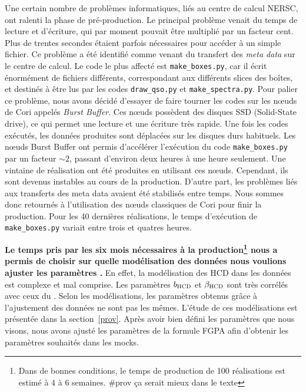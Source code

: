 \documentclass[11pt, twoside, a4paper, openright]{report}
\begin{document}
Une certain nombre de problèmes informatiques, liés au centre de calcul NERSC, ont ralenti la phase de pré-production. Le principal problème venait du temps de lecture et d'écriture, qui par moment pouvait être multiplié par un facteur cent. Plus de trentes secondes étaient parfois nécessaires pour accéder à un simple fichier. Ce problème a été identifié comme venant du transfert des \emph{meta data} sur le centre de calcul. Le code le plus affecté est \texttt{make\_boxes.py}, car il écrit énormément de fichiers différents, correspondant aux différents slices des boîtes, et destinés à être lus par les codes \texttt{draw\_qso.py} et \texttt{make\_spectra.py}. Pour palier ce problème, nous avons décidé d'essayer de faire tourner les codes sur les n{\oe}uds de Cori appelés \emph{Burst Buffer}. Ces n{\oe}uds possèdent des disques SSD (Solid-State drive), ce qui permet une lecture et une écriture très rapide. Une fois les codes exécutés, les données produites sont déplacées sur les disques durs habituels. Les n{\oe}uds Burst Buffer ont permis d'accélérer l'exécution du code \texttt{make\_boxes.py} par un facteur $\sim \num{2}$, passant d'environ deux heures à une heure seulement. Une vintaine de réalisation ont été produites en utilisant ces n{\oe}uds. Cependant, ils sont devenus instables au cours de la production. D'autre part, les problèmes liés aux transferts des meta data avaient été stabilisés entre temps. Nous sommes donc retournés à l'utilisation des n{\oe}uds classiques de Cori pour finir la production. Pour les 40 dernières réalisations, le temps d'exécution de \texttt{make\_boxes.py} variait entre trois et quatres heures.

\textbf{
  Le temps pris par les six mois nécessaires à la production\footnote{Dans de bonnes conditions, le temps de production de 100 réalisations est estimé à 4 à 6 semaines. \#prov ça serait mieux dans le texte} nous a permis de
  choisir sur quelle modélisation des données nous voulions ajuster les paramètres \lya{}.}
  En effet, la modélisation des HCD dans les données est complexe et mal comprise. Les paramètres $b_{\textsc{HCD}}$ et $\beta_{\textsc{HCD}}$ sont très corrélés avec ceux du \lya{}. Selon les modélisations, les paramètres \lya{} obtenus grâce à l'ajustement des données ne sont pas les mêmes. L'étude de ces modélisations est présentée dans la section~\ref{prov}.
Après avoir bien défini les paramètres \lya{} que nous visons, nous avons ajusté les paramètres de la formule FGPA afin d'obtenir les paramètres \lya{} souhaités dans les mocks.
\end{document}
